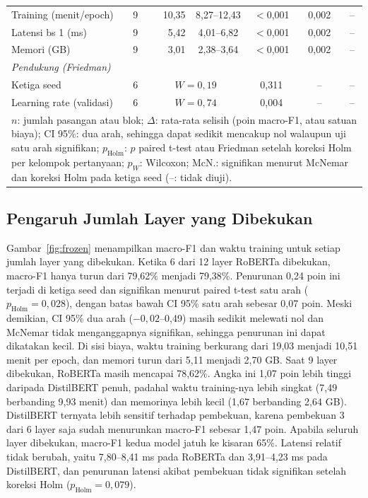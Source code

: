 \documentclass[conference]{IEEEtran}
\begin{document}
\begin{table}[t]
\begin{tabular}{lcrcccc}
Training (menit/epoch) & 9 & 10,35 & 8,27--12,43 & $<$0,001 & 0,002 & -- \\
Latensi bs 1 (ms) & 9 & 5,42 & 4,01--6,82 & $<$0,001 & 0,002 & -- \\
Memori (GB) & 9 & 3,01 & 2,38--3,64 & $<$0,001 & 0,002 & -- \\
\hline
\multicolumn{7}{l}{\textit{Pendukung (Friedman)}} \\
Ketiga seed & 6 & \multicolumn{2}{c}{$W = 0{,}19$} & 0,311 & -- & -- \\
Learning rate (validasi) & 6 & \multicolumn{2}{c}{$W = 0{,}74$} & 0,004 & -- & -- \\
\hline
\multicolumn{7}{p{0.95\columnwidth}}{$n$: jumlah pasangan atau blok; $\Delta$: rata-rata selisih (poin macro-F1, atau satuan biaya); CI 95\%: dua arah, sehingga dapat sedikit mencakup nol walaupun uji satu arah signifikan; $p_{\mathrm{Holm}}$: $p$ paired t-test atau Friedman setelah koreksi Holm per kelompok pertanyaan; $p_W$: Wilcoxon; McN.: signifikan menurut McNemar dan koreksi Holm pada ketiga seed (--: tidak diuji).}
\end{tabular}
\end{table}

\subsection{Pengaruh Jumlah Layer yang Dibekukan}
Gambar~\ref{fig:frozen} menampilkan macro-F1 dan waktu training untuk setiap jumlah layer yang dibekukan. Ketika 6 dari 12 layer RoBERTa dibekukan, macro-F1 hanya turun dari 79,62\% menjadi 79,38\%. Penurunan 0,24 poin ini terjadi di ketiga seed dan signifikan menurut paired t-test satu arah ($p_{\mathrm{Holm}} = 0{,}028$), dengan batas bawah CI 95\% satu arah sebesar 0,07 poin. Meski demikian, CI 95\% dua arah ($-0{,}02$--0,49) masih sedikit melewati nol dan McNemar tidak menganggapnya signifikan, sehingga penurunan ini dapat dikatakan kecil. Di sisi biaya, waktu training berkurang dari 19,03 menjadi 10,51 menit per epoch, dan memori turun dari 5,11 menjadi 2,70 GB. Saat 9 layer dibekukan, RoBERTa masih mencapai 78,62\%. Angka ini 1,07 poin lebih tinggi daripada DistilBERT penuh, padahal waktu training-nya lebih singkat (7,49 berbanding 9,93 menit) dan memorinya lebih kecil (1,67 berbanding 2,64 GB). DistilBERT ternyata lebih sensitif terhadap pembekuan, karena pembekuan 3 dari 6 layer saja sudah menurunkan macro-F1 sebesar 1,47 poin. Apabila seluruh layer dibekukan, macro-F1 kedua model jatuh ke kisaran 65\%. Latensi relatif tidak berubah, yaitu 7,80--8,41 ms pada RoBERTa dan 3,91--4,23 ms pada DistilBERT, dan penurunan latensi akibat pembekuan tidak signifikan setelah koreksi Holm ($p_{\mathrm{Holm}} = 0{,}079$).
\end{document}
